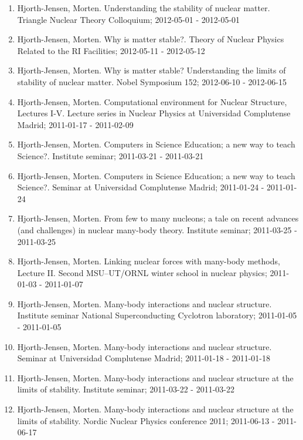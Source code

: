 \documentclass[%
oneside,                 %
final,                   %
10pt]{article}
\begin{document}
\begin{enumerate}
\item Hjorth-Jensen, Morten.  Understanding the stability of nuclear matter. Triangle Nuclear Theory Colloquium; 2012-05-01 - 2012-05-01

\item Hjorth-Jensen, Morten.  Why is matter stable?. Theory of Nuclear Physics Related to the RI Facilities; 2012-05-11 - 2012-05-12

\item Hjorth-Jensen, Morten.  Why is matter stable? Understanding the limits of stability of nuclear matter. Nobel Symposium 152; 2012-06-10 - 2012-06-15

\item Hjorth-Jensen, Morten. Computational environment for Nuclear Structure, Lectures I-V. Lecture series in Nuclear Physics at Universidad Complutense Madrid; 2011-01-17 - 2011-02-09

\item Hjorth-Jensen, Morten.  Computers in Science Education; a new way to teach Science?. Institute seminar; 2011-03-21 - 2011-03-21

\item Hjorth-Jensen, Morten.  Computers in Science Education; a new way to teach Science?. Seminar at Universidad Complutense Madrid; 2011-01-24 - 2011-01-24

\item Hjorth-Jensen, Morten.  From few to many nucleons; a tale on recent advances (and challenges) in nuclear many-body theory. Institute seminar; 2011-03-25 - 2011-03-25

\item Hjorth-Jensen, Morten. Linking nuclear forces with many-body methods, Lecture II. Second MSU--UT/ORNL winter school in nuclear physics; 2011-01-03 - 2011-01-07

\item Hjorth-Jensen, Morten.  Many-body interactions and nuclear structure. Institute seminar National Superconducting Cyclotron laboratory; 2011-01-05 - 2011-01-05

\item Hjorth-Jensen, Morten.  Many-body interactions and nuclear structure. Seminar at Universidad Complutense Madrid; 2011-01-18 - 2011-01-18

\item Hjorth-Jensen, Morten.  Many-body interactions and nuclear structure at the limits of stability. Institute seminar; 2011-03-22 - 2011-03-22

\item Hjorth-Jensen, Morten.  Many-body interactions and nuclear structure at the limits of stability. Nordic Nuclear Physics conference 2011; 2011-06-13 - 2011-06-17


\end{enumerate}
\end{document}
